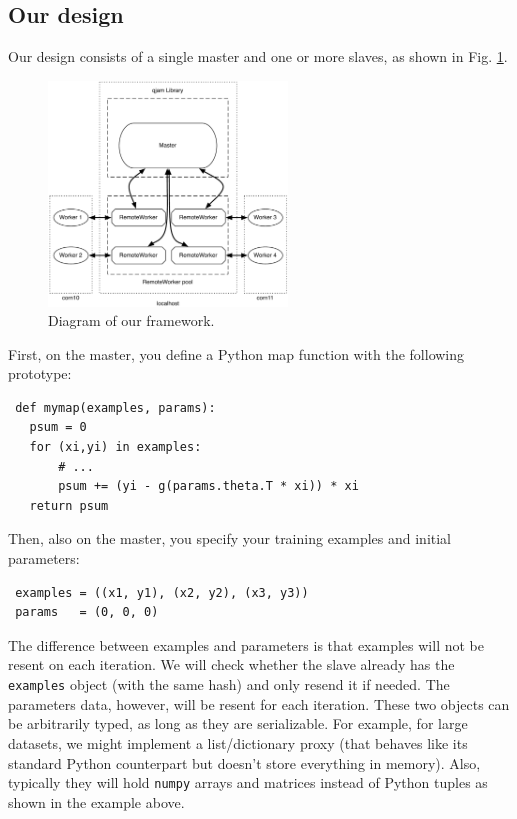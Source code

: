 \documentclass[%
  final,
  notitlepage,
  narroweqnarray,
  inline,
]{ieee}
\begin{document}
\subsection{Our design}

Our design consists of a single master and one or more slaves, as shown in
Fig. \ref{diagram}.

\begin{figure}[hb]
  \begin{center}
    \includegraphics[width=2.5in]{fwk_diagram/fwk_diagram.pdf}
  \end{center}
  \caption{Diagram of our framework.}
  \label{diagram}
\end{figure}

First, on the master, you define a Python map function with the following
prototype:
\begin{verbatim}
 def mymap(examples, params):
   psum = 0
   for (xi,yi) in examples:
       # ...
       psum += (yi - g(params.theta.T * xi)) * xi
   return psum
\end{verbatim}

Then, also on the master, you specify your training examples and initial
parameters:
\begin{verbatim}
 examples = ((x1, y1), (x2, y2), (x3, y3))
 params   = (0, 0, 0)
\end{verbatim}

The difference between examples and parameters is that examples will not be
resent on each iteration. We will check whether the slave already has the {\tt
  examples} object (with the same hash) and only resend it if needed. The
parameters data, however, will be resent for each iteration. These two objects
can be arbitrarily typed, as long as they are serializable. For example, for
large datasets, we might implement a list/dictionary proxy (that behaves like
its standard Python counterpart but doesn't store everything in memory). Also,
typically they will hold {\tt numpy} arrays and matrices instead of Python
tuples as shown in the example above.
\end{document}
